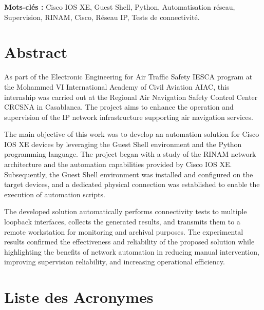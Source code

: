 \documentclass[12pt, a4paper, oneside]{report}
\begin{document}
\noindent\textbf{Mots-clés :} Cisco IOS XE, Guest Shell, Python, Automatisation réseau, 
Supervision, RINAM, Cisco, Réseau IP, Tests de connectivité.

\vspace{0.5cm}


\newpage
\chapter*{Abstract}
As part of the Electronic Engineering for Air Traffic Safety \ac{IESCA} program at
 the Mohammed VI International Academy of Civil Aviation \ac{AIAC}, this internship
  was carried out at the Regional Air Navigation Safety Control Center \ac{CRCSNA}
   in Casablanca. The project aims to enhance the operation and supervision of 
   the IP network infrastructure supporting air navigation services.

The main objective of this work was to develop an automation solution for Cisco
 IOS XE devices by leveraging the Guest Shell environment and the Python 
 programming language. The project began with a study of the RINAM network architecture 
 and the automation capabilities provided by Cisco IOS XE. Subsequently, the Guest 
 Shell environment was installed and configured on the target devices, and a 
 dedicated physical connection was established to enable the execution of automation scripts.

The developed solution automatically performs connectivity tests to multiple 
loopback interfaces, collects the generated results, and transmits them to a 
remote workstation for monitoring and archival purposes. The experimental results 
confirmed the effectiveness and reliability of the proposed solution while highlighting 
the benefits of network automation in reducing manual intervention, improving supervision 
reliability, and increasing operational efficiency.



\newpage
\chapter*{Liste des Acronymes}
\end{document}
